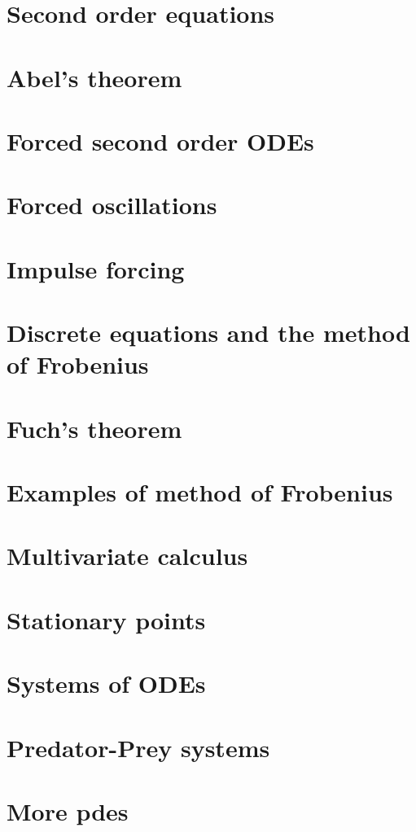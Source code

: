 \documentclass{article}
\begin{document}
\section{Second order equations}

\section{Abel's theorem}

\section{Forced second order ODEs}

\section{Forced oscillations}

\section{Impulse forcing}

\section{Discrete equations and the method of Frobenius}

\section{Fuch's theorem}

\section{Examples of method of Frobenius}

\section{Multivariate calculus}

\section{Stationary points}

\section{Systems of ODEs}

\section{Predator-Prey systems}

\section{More pdes}

\end{document}
